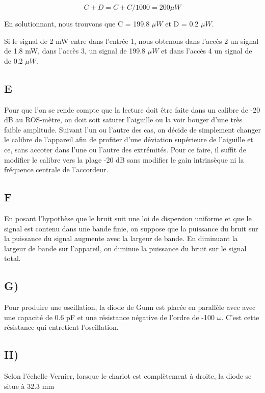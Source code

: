 \begin{equation}
	C+D = C+C/1000 = 200\mu W
\end{equation}

En solutionnant, nous trouvons que C = 199.8 $\mu W$ et D = 0.2 $\mu W$.

Si le signal de 2 mW entre dans l'entrée 1, nous obtenons dans l'accès 2 un signal de 1.8 mW, dans l'accès 3, un signal de 199.8 $\mu W$ et dans l'accès 4 un signal de de 0.2 $\mu W$.

\subsection{E}
Pour que l'on se rende compte que la lecture doit être faite dans un calibre de -20 dB au ROS-mètre, on doit soit saturer l'aiguille ou la voir bouger d'une très faible amplitude. Suivant l'un ou l'autre des cas, on décide de simplement changer le calibre de l'appareil afin de profiter d'une déviation supérieure de l'aiguille et ce, sans accoter dans l'une ou l'autre des extrémités. Pour ce faire, il suffit de modifier le calibre vers la plage -20 dB sans modifier le gain intrinsèque ni la fréquence centrale de l'accordeur. 

\subsection{F}
En posant l'hypothèse que le bruit suit une loi de dispersion uniforme et que le signal est contenu dans une bande finie, on suppose que la puissance du bruit sur la puissance du signal augmente avec la largeur de bande. En diminuant la largeur de bande sur l'appareil, on diminue la puissance du bruit sur le signal total. 

\subsection{G)}
Pour produire une oscillation, la diode de Gunn est placée en parallèle avec avec une capacité de 0.6 pF et une résistance négative de l'ordre de -100 $\omega$. C'est cette résistance qui entretient l'oscillation.

\subsection{H)}
Selon l'échelle Vernier, lorsque le chariot est complètement à droite, la diode se situe à 32.3 mm